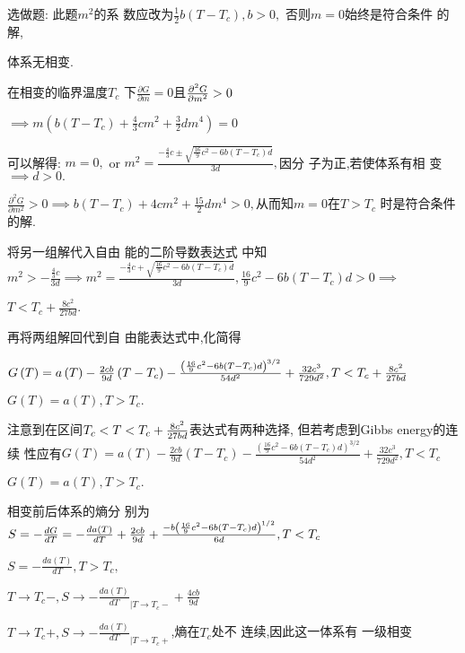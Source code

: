 \documentclass{ctexart}
\begin{document}
\bigskip 选做题: 此题$m^{2}$的系%
数应改为$\frac{1}{2}b\left( T-T_{c}\right) ,b>0,$%
否则$m=0$始终是符合条件%
的解,

体系无相变.

在相变的临界温度$T_{c}$%
下$\frac{\partial G}{\partial m}=0$且$\frac{\partial ^{2}G}{%
\partial m^{2}}>0$

$\implies m\left( b\left( T-T_{c}\right) +\frac{4}{3}cm^{2}+\frac{3}{2}%
dm^{4}\right) =0$

可以解得: $m=0,$ or $m^{2}=\frac{-\frac{4}{3}c\pm 
\sqrt{\frac{16}{9}c^{2}-6b\left( T-T_{c}\right) d}}{3d},$因分%
子为正,若使体系有相%
变$\implies d>0.$

$\frac{\partial ^{2}G}{\partial m^{2}}>0\implies b\left( T-T_{c}\right)
+4cm^{2}+\frac{15}{2}dm^{4}>0,$从而知$m=0$在$T>T_{c}$%
时是符合条件的解.

将另一组解代入自由%
能的二阶导数表达式%
中知$m^{2}>-\frac{\frac{4}{3}c}{3d}\implies m^{2}=\frac{-\frac{4%
}{3}c+\sqrt{\frac{16}{9}c^{2}-6b\left( T-T_{c}\right) d}}{3d},\frac{16}{9}%
c^{2}-6b\left( T-T_{c}\right) d>0\implies $

$T<T_{c}+\frac{8c^{2}}{27bd}.$

再将两组解回代到自%
由能表达式中,化简得

$G\left( T\right) =a\left( T\right) -\frac{2cb}{9d}\left( T-T_{c}\right) -%
\frac{\left( \frac{16}{9}c^{2}-6b\left( T-T_{c}\right) d\right) ^{3/2}}{%
54d^{2}}+\frac{32c^{3}}{729d^{2}},T<T_{c}+\frac{8c^{2}}{27bd}$

$G\left( T\right) =a\left( T\right) ,T>T_{c}.$

注意到在区间$T_{c}<T<T_{c}+\frac{8c^{2}}{%
27bd}$表达式有两种选择,%
但若考虑到Gibbs energy的连续%
性应有$G\left( T\right) =a\left( T\right) -\frac{2cb}{9d}%
\left( T-T_{c}\right) -\frac{\left( \frac{16}{9}c^{2}-6b\left(
T-T_{c}\right) d\right) ^{3/2}}{54d^{2}}+\frac{32c^{3}}{729d^{2}},T<T_{c}$

$G\left( T\right) =a\left( T\right) ,T>T_{c}.$

相变前后体系的熵分%
别为$S=-\frac{dG}{dT}=-\frac{da\left( T\right) }{dT}+\frac{2cb}{%
9d}+\frac{-b\left( \frac{16}{9}c^{2}-6b\left( T-T_{c}\right) d\right) ^{1/2}%
}{6d},T<T_{c}$

$S=-\frac{da\left( T\right) }{dT},T>T_{c},$

$T\rightarrow T_{c}-,S\rightarrow -\frac{da\left( T\right) }{dT}%
_{|T\rightarrow T_{c}-}+\frac{4cb}{9d}$

\bigskip $T\rightarrow T_{c}+,S\rightarrow -\frac{da\left( T\right) }{dT}%
_{|T\rightarrow T_{c}+}$\bigskip ,熵在$T_{c}$处不%
连续,因此这一体系有%
一级相变
\end{document}
